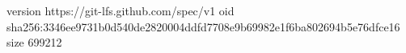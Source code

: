 version https://git-lfs.github.com/spec/v1
oid sha256:3346ee9731b0d540de2820004ddfd7708e9b69982e1f6ba802694b5e76dfce16
size 699212
